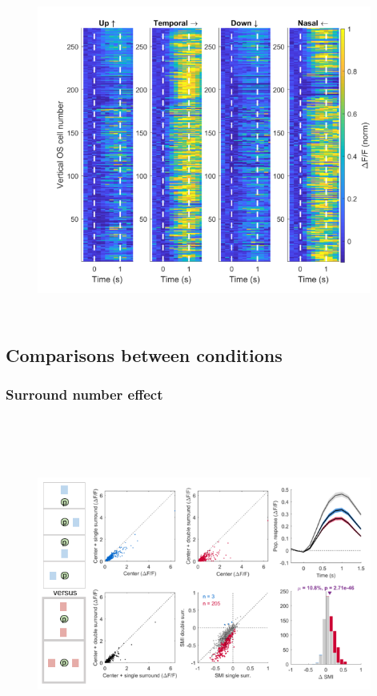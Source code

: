 \begin{figure}[H] \centering \includegraphics[width=11cm,height=11cm,keepaspectratio]{Figures/7.Results/finalPopulation/sel/popPlots_vertOS_centerOnly.png} 
\end{figure}

\subsection{Comparisons between conditions}
\label{sec:comparisons}

\subsubsection{Surround number effect}

\begin{figure}[H] \centering \includegraphics[width=11cm,height=11cm,keepaspectratio]{Figures/7.Results/finalPopulation/sel/diagrams/1.png} 
\end{figure}

